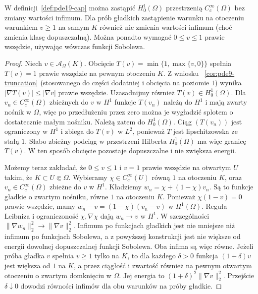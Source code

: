 \begin{lemat}
\label{lem:pde19-smooth}
W definicji~\ref{def:pde19-cap} można zastąpić $H_0^1(\Omega)$
przestrzenią $C_c^\infty(\Omega)$ bez zmiany wartości infimum.
Dla prób gładkich zastąpienie warunku na otoczeniu
warunkiem $v\ge1$ na samym $K$ również nie zmienia
wartości infimum (choć zmienia klasę dopuszczalną). Można ponadto wymagać
$0\le v\le1$ prawie wszędzie, używając wówczas
funkcji Sobolewa.
\end{lemat}
\begin{proof}
Niech $v\in\mathcal A_\Omega(K)$. Obcięcie
$T(v)=\min\{1,\max\{v,0\}\}$ spełnia $T(v)=1$ prawie
wszędzie na pewnym otoczeniu $K$. Z wniosku
~\ref{cor:pde9-truncation} (stosowanego do części dodatniej
i obcięcia na poziomie $1$) wynika
$|\nabla T(v)|\le|\nabla v|$ prawie wszędzie.
Uzasadnijmy również $T(v)\in H_0^1(\Omega)$.
Dla $v_n\in C_c^\infty(\Omega)$ zbieżnych do $v$ w $H^1$
funkcje $T(v_n)$ należą do $H^1$ i mają zwarty nośnik
w $\Omega$, więc po przedłużeniu przez zero można je
wygładzić splotem o dostatecznie małym nośniku.
Należą zatem do $H_0^1(\Omega)$.
Ciąg $(T(v_n))$ jest ograniczony w $H^1$ i zbiega
do $T(v)$ w $L^2$, ponieważ $T$ jest lipschitzowska
ze stałą $1$. Słabo zbieżny podciąg w przestrzeni Hilberta
$H_0^1(\Omega)$ ma więc granicę $T(v)$.
W ten sposób obcięcie pozostaje dopuszczalne
i nie zwiększa energii.

Możemy teraz zakładać, że $0\le v\le1$ i $v=1$
prawie wszędzie na otwartym $U$ takim, że
$K\subset U\Subset\Omega$. Wybieramy
$\chi\in C_c^\infty(U)$ równą $1$ na otoczeniu $K$,
oraz $v_n\in C_c^\infty(\Omega)$ zbieżne do $v$ w $H^1$.
Kładziemy $w_n=\chi+(1-\chi)v_n$. Są to funkcje gładkie
o zwartym nośniku, równe $1$ na otoczeniu $K$.
Ponieważ $\chi(1-v)=0$ prawie wszędzie, mamy
$w_n-v=(1-\chi)(v_n-v)$ w $H^1(\Omega)$.
Reguła Leibniza i ograniczoność $\chi,\nabla\chi$
dają $w_n\to v$ w $H^1$.
W szczególności $\|\nabla w_n\|_2^2\to\|\nabla v\|_2^2$.
Infimum po funkcjach gładkich jest nie mniejsze niż
infimum po funkcjach Sobolewa, a z powyższej konstrukcji
jest nie większe od energii dowolnej dopuszczalnej funkcji
Sobolewa. Oba infima są więc równe.
Jeżeli próba gładka $v$ spełnia $v\ge1$ tylko na $K$,
to dla każdego $\delta>0$ funkcja $(1+\delta)v$ jest
większa od $1$ na $K$, a przez ciągłość i zwartość
również na pewnym otwartym otoczeniu o zwartym
domknięciu w $\Omega$. Jej energia to
$(1+\delta)^2\|\nabla v\|_2^2$. Przejście
$\delta\downarrow0$ dowodzi równości infimów
dla obu warunków na próby gładkie.
\end{proof}

